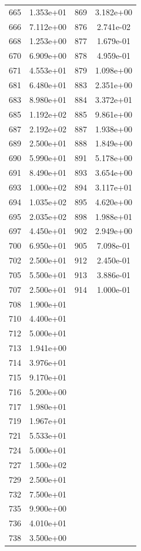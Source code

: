\documentclass[12pt]{article}
\begin{document}
\begin{longtable}{@{}cccc@{}}
665 & 1.353e+01 & 869 & 3.182e+00 \\
666 & 7.112e+00 & 876 & 2.741e-02 \\
668 & 1.253e+00 & 877 & 1.679e-01 \\
670 & 6.909e+00 & 878 & 4.959e-01 \\
671 & 4.553e+01 & 879 & 1.098e+00 \\
681 & 6.480e+01 & 883 & 2.351e+00 \\
683 & 8.980e+01 & 884 & 3.372e+01 \\
685 & 1.192e+02 & 885 & 9.861e+00 \\
687 & 2.192e+02 & 887 & 1.938e+00 \\
689 & 2.500e+01 & 888 & 1.849e+00 \\
690 & 5.990e+01 & 891 & 5.178e+00 \\
691 & 8.490e+01 & 893 & 3.654e+00 \\
693 & 1.000e+02 & 894 & 3.117e+01 \\
694 & 1.035e+02 & 895 & 4.620e+00 \\
695 & 2.035e+02 & 898 & 1.988e+01 \\
697 & 4.450e+01 & 902 & 2.949e+00 \\
700 & 6.950e+01 & 905 & 7.098e-01 \\
702 & 2.500e+01 & 912 & 2.450e-01 \\
705 & 5.500e+01 & 913 & 3.886e-01 \\
707 & 2.500e+01 & 914 & 1.000e-01 \\
708 & 1.900e+01 &  &  \\
710 & 4.400e+01 &  &  \\
712 & 5.000e+01 &  &  \\
713 & 1.941e+00 &  &  \\
714 & 3.976e+01 &  &  \\
715 & 9.170e+01 &  &  \\
716 & 5.200e+00 &  &  \\
717 & 1.980e+01 &  &  \\
719 & 1.967e+01 &  &  \\
721 & 5.533e+01 &  &  \\
724 & 5.000e+01 &  &  \\
727 & 1.500e+02 &  &  \\
729 & 2.500e+01 &  &  \\
732 & 7.500e+01 &  &  \\
735 & 9.900e+00 &  &  \\
736 & 4.010e+01 &  &  \\
738 & 3.500e+00 &  &  \\

\end{longtable}
\end{document}
